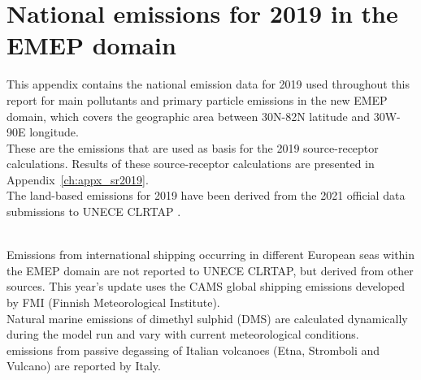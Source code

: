 \setcounter{page}{1}

\cleardoublepage
\chapter[2019 Emissions]{National emissions for 2019 in the EMEP domain}
\label{ch:appx_emis_2019}


This appendix contains the national emission data for 2019 used throughout this
report for main pollutants and  primary particle emissions in the new 
EMEP domain, which covers the geographic area between 30\degrees N-82\degrees N latitude and 30\degrees W-90\degrees E longitude. \\

These are the emissions that are used as basis
 for the 2019 source-receptor calculations. Results of these
 source-receptor calculations are presented in Appendix~\ref{ch:appx_sr2019}.\\

The land-based emissions for 2019 have been derived from the 2021
official data submissions to UNECE CLRTAP \citep{CEIP2021}.

 \\

Emissions from international shipping occurring in different European seas within the EMEP domain are not reported to UNECE CLRTAP, but derived from other sources. This year's update uses the CAMS global shipping emissions \citep{CAMSemis2019}  developed by FMI (Finnish Meteorological Institute).
\\

Natural marine emissions of dimethyl sulphid (DMS) are calculated dynamically during the model run and vary with current meteorological conditions.\\

\sox emissions from passive degassing of Italian volcanoes (Etna, Stromboli and Vulcano) are reported by Italy. \\

